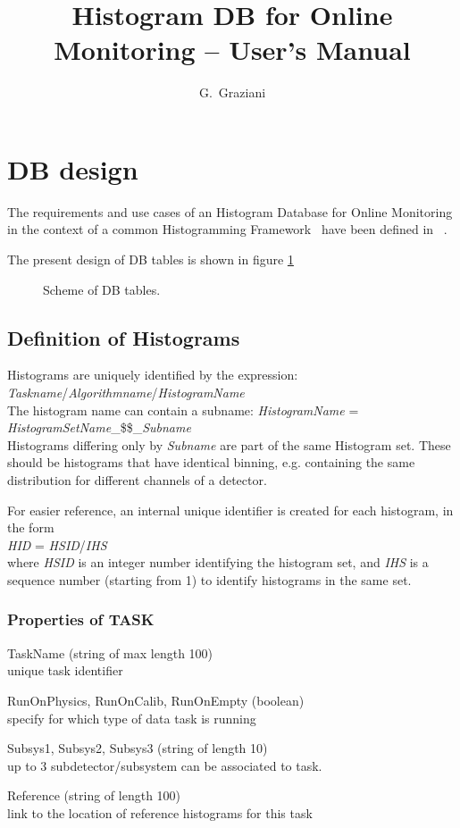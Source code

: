 \documentclass{lhcbnote}
\title{Histogram DB for Online Monitoring -- User's Manual}
\author{G.~Graziani}
\begin{document}
\maketitle


\section{DB design}
The requirements and use cases of an Histogram Database for Online
Monitoring in the context of a common Histogramming Framework~\cite{genhisto}
have been defined in ~\cite{dbdesign}.

The present design of DB tables is shown in figure \ref{DBschema}


\begin{figure}[htb]
\centerline{}
\caption{Scheme of DB tables. }
\label{DBschema}
\end{figure}

\subsection{Definition of Histograms}
Histograms are uniquely identified by the expression:\\
{\it Taskname}/{\it Algorithmname}/{\it HistogramName}\\
The histogram name can contain a subname:
{\it HistogramName} = {\it HistogramSetName}\_\$\$\_{\it Subname}\\
Histograms differing only by {\it Subname} are part of the same
Histogram set. These should be histograms that have identical binning,
e.g. containing the same distribution for different channels of a detector.

For easier reference, an internal unique identifier is created for
each histogram, in the form\\
{\it HID} = {\it HSID}/{\it IHS}\\
where {\it HSID} is an integer number identifying the histogram set,
and {\it IHS} is a sequence number (starting from 1) to identify histograms in
the same set.

\subsubsection{Properties of TASK}
\begin{description}
\item{TaskName} (string of max length 100) \\
unique task identifier
\item{RunOnPhysics, RunOnCalib, RunOnEmpty} (boolean)\\
specify for which type of data task is running 
\item{Subsys1, Subsys2, Subsys3} (string of length 10)\\
up to 3 subdetector/subsystem can be associated to task. 
\item{Reference}  (string of length 100)\\
link to the location of reference histograms for this task
\end{description}
\end{document}
